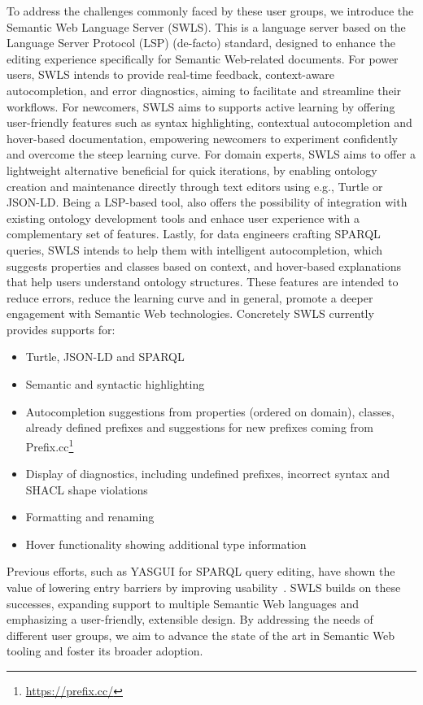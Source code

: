 To address the challenges commonly faced by these user groups, we introduce the Semantic Web Language Server (SWLS).
This is a language server based on the Language Server Protocol (LSP) (de-facto) standard, designed to enhance the editing experience specifically for Semantic Web-related documents. 
For power users, SWLS intends to provide real-time feedback, context-aware autocompletion, and error diagnostics, aiming to facilitate and streamline their workflows.
For newcomers, SWLS aims to supports active learning by offering user-friendly features such as syntax highlighting, contextual autocompletion and hover-based documentation, empowering newcomers to experiment confidently and overcome the steep learning curve.
For domain experts, SWLS aims to offer a lightweight alternative beneficial for quick iterations, by enabling ontology creation and maintenance directly through text editors using e.g., Turtle or JSON-LD. Being a LSP-based tool, also offers the possibility of integration with existing ontology development tools and enhace user experience with a complementary set of features.
Lastly, for data engineers crafting SPARQL queries, SWLS intends to help them with intelligent autocompletion, which suggests properties and classes based on context, and hover-based explanations that help users understand ontology structures.
These features are intended to reduce errors, reduce the learning curve and in general, promote a deeper engagement with Semantic Web technologies.
Concretely SWLS currently provides supports for:
\begin{itemize}
  \item Turtle, JSON-LD and SPARQL
  \item Semantic and syntactic highlighting
  \item Autocompletion suggestions from properties (ordered on domain), classes, already defined prefixes and suggestions for new prefixes coming from Prefix.cc\footnote{\url{https://prefix.cc/}}
  \item Display of diagnostics, including undefined prefixes, incorrect syntax and SHACL shape violations
  \item Formatting and renaming
  \item Hover functionality showing additional type information
\end{itemize}

Previous efforts, such as YASGUI for SPARQL query editing, have shown the value of lowering entry barriers by improving usability~\cite{10.3233/SW-150197,10.1007/978-3-642-41242-4_7}. 
SWLS builds on these successes, expanding support to multiple Semantic Web languages and emphasizing a user-friendly, extensible design. 
By addressing the needs of different user groups, we aim to advance the state of the art in Semantic Web tooling and foster its broader adoption.

